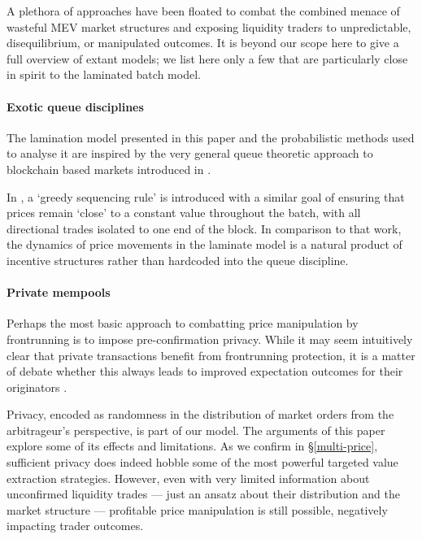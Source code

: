 A plethora of approaches have been floated to combat the combined menace of wasteful MEV market structures and exposing liquidity traders to unpredictable, disequilibrium, or manipulated outcomes.
%
It is beyond our scope here to give a full overview of extant models; we list here only a few that are particularly close in spirit to the laminated batch model.

\paragraph{Exotic queue disciplines}
The lamination model presented in this paper and the probabilistic methods used to analyse it are inspired by the very general queue theoretic approach to blockchain based markets introduced in \cite{macpherson2023adversarial}.

In \cite{ferreira2022credible}, a `greedy sequencing rule' is introduced with a similar goal of ensuring that prices remain `close' to a constant value throughout the batch, with all directional trades isolated to one end of the block.
%
%
In comparison to that work, the dynamics of price movements in the laminate model is a natural product of incentive structures rather than hardcoded into the queue discipline.

\paragraph{Private mempools}
Perhaps the most basic approach to combatting price manipulation by frontrunning is to impose pre-confirmation privacy.
%
While it may seem intuitively clear that private transactions benefit from frontrunning protection, it is a matter of debate whether this always leads to improved expectation outcomes for their originators \cite{schoneborn2009liquidation,marshall2023false}.

Privacy, encoded as randomness in the distribution of market orders from the arbitrageur's perspective, is part of our model.
%
The arguments of this paper explore some of its effects and limitations.
%
As we confirm in \S\ref{multi-price}, sufficient privacy does indeed hobble some of the most powerful targeted value extraction strategies.
%
However, even with very limited information about unconfirmed liquidity trades --- just an ansatz about their distribution and the market structure --- profitable price manipulation is still possible, negatively impacting trader outcomes.


